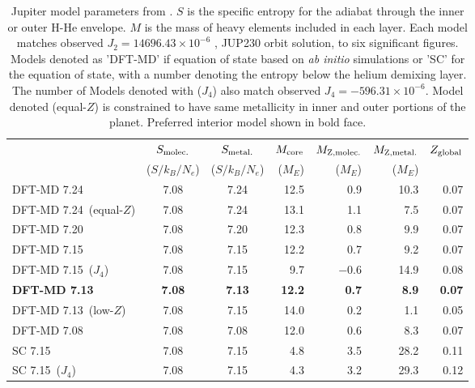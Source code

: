 \begin{table}
\centering

\caption{Jupiter model parameters from \cite{hubbard2016}. $S$ is the
specific entropy for the adiabat through the inner or outer H-He envelope. $M$ is the
mass of heavy elements included in each layer. Each model matches
observed  $J_2 = 14696.43 \times 10^{−6}$ \citep{jacobson2003}, JUP230 orbit solution,
to six significant figures. Models denoted as 'DFT-MD' if equation of state based on
\textit{ab initio} simulations or 'SC' for the \citet{saumon1995} equation of
state, with a number denoting the entropy below the helium demixing layer.  The
number of Models denoted with ($J_4$) also match observed $J_4=-596.31\times
10^{-6}$. Model denoted (equal-$Z$) is constrained to have same metallicity in inner
and outer portions of the planet. Preferred interior model shown in bold face.
\label{tab:model_values}}

\begin{tabular}{l|cc|rrrr}
    \hline
    {} & {$S_{\rm molec.}$} &  {$S_{\rm metal.}$} & {$M_{\rm core}$} & {$M_{\rm Z,molec.}$}
    & {$M_{\rm Z,metal.}$} & {$Z_{\rm global}$} \\
    &  {($S/k_B/N_e$)} & {($S/k_B/N_e$)} & {($M_E$)} &  {($M_E$)} &  {($M_E$)} & \\
    \hline
    DFT-MD   7.24             &  7.08  &  7.24  &  12.5  &  0.9     &  10.3  &  0.07  \\
    DFT-MD  7.24~(equal-$Z$)  &  7.08  &  7.24  &  13.1  &  1.1     &  7.5   &  0.07  \\
    DFT-MD  7.20              &  7.08  &  7.20  &  12.3  &  0.8     &  9.9   &  0.07  \\
    DFT-MD  7.15              &  7.08  &  7.15  &  12.2  &  0.7     &  9.2   &  0.07  \\
    DFT-MD  7.15~($J_4$)      &  7.08  &  7.15  &  9.7   &  $-$0.6  &  14.9  &  0.08  \\
    {\bf DFT-MD 7.13}       & {\bf 7.08}   & {\bf 7.13} & {\bf 12.2}  & {\bf  0.7}   &
    {\bf 8.9}   &  {\bf 0.07}  \\
    DFT-MD  7.13~(low-$Z$)  &  7.08  &  7.15  &  14.0  &  0.2  &  1.1   &  0.05  \\
    DFT-MD  7.08            &  7.08  &  7.08  &  12.0  &  0.6  &  8.3   &  0.07  \\
    SC      7.15            &  7.08  &  7.15  &  4.8   &  3.5  &  28.2  &  0.11  \\
    SC      7.15~($J_4$)    &  7.08  &  7.15  &  4.3   &  3.2  &  29.3  &  0.12  \\
    \hline
\end{tabular}

\end{table}

